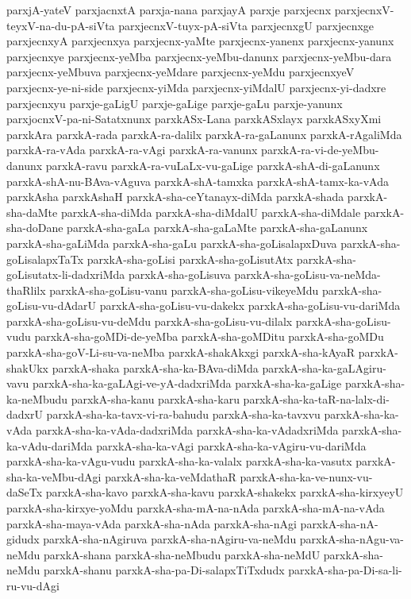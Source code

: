 {parxjA-yateV
parxjacnxtA
parxja-nana
parxjayA
parxje
parxjecnx
parxjecnxV-teyxV-na-du-pA-siVta
parxjecnxV-tuyx-pA-siVta
parxjecnxgU
parxjecnxge
parxjecnxyA
parxjecnxya
parxjecnx-yaMte
parxjecnx-yanenx
parxjecnx-yanunx
parxjecnxye
parxjecnx-yeMba
parxjecnx-yeMbu-danunx
parxjecnx-yeMbu-dara
parxjecnx-yeMbuva
parxjecnx-yeMdare
parxjecnx-yeMdu
parxjecnxyeV
parxjecnx-ye-ni-side
parxjecnx-yiMda
parxjecnx-yiMdalU
parxjecnx-yi-dadxre
parxjecnxyu
parxje-gaLigU
parxje-gaLige
parxje-gaLu
parxje-yanunx
parxjocnxV-pa-ni-Satatxnunx
parxkASx-Lana
parxkASxlayx
parxkASxyXmi
parxkAra
parxkA-rada
parxkA-ra-dalilx
parxkA-ra-gaLanunx
parxkA-rAgaliMda
parxkA-ra-vAda
parxkA-ra-vAgi
parxkA-ra-vanunx
parxkA-ra-vi-de-yeMbu-danunx
parxkA-ravu
parxkA-ra-vuLaLx-vu-gaLige
parxkA-shA-di-gaLanunx
parxkA-shA-nu-BAva-vAguva
parxkA-shA-tamxka
parxkA-shA-tamx-ka-vAda
parxkAsha
parxkAshaH
parxkA-sha-ceYtanayx-diMda
parxkA-shada
parxkA-sha-daMte
parxkA-sha-diMda
parxkA-sha-diMdalU
parxkA-sha-diMdale
parxkA-sha-doDane
parxkA-sha-gaLa
parxkA-sha-gaLaMte
parxkA-sha-gaLanunx
parxkA-sha-gaLiMda
parxkA-sha-gaLu
parxkA-sha-goLisalapxDuva
parxkA-sha-goLisalapxTaTx
parxkA-sha-goLisi
parxkA-sha-goLisutAtx
parxkA-sha-goLisutatx-li-dadxriMda
parxkA-sha-goLisuva
parxkA-sha-goLisu-va-neMda-thaRlilx
parxkA-sha-goLisu-vanu
parxkA-sha-goLisu-vikeyeMdu
parxkA-sha-goLisu-vu-dAdarU
parxkA-sha-goLisu-vu-dakekx
parxkA-sha-goLisu-vu-dariMda
parxkA-sha-goLisu-vu-deMdu
parxkA-sha-goLisu-vu-dilalx
parxkA-sha-goLisu-vudu
parxkA-sha-goMDi-de-yeMba
parxkA-sha-goMDitu
parxkA-sha-goMDu
parxkA-sha-goV-Li-su-va-neMba
parxkA-shakAkxgi
parxkA-sha-kAyaR
parxkA-shakUkx
parxkA-shaka
parxkA-sha-ka-BAva-diMda
parxkA-sha-ka-gaLAgiru-vavu
parxkA-sha-ka-gaLAgi-ve-yA-dadxriMda
parxkA-sha-ka-gaLige
parxkA-sha-ka-neMbudu
parxkA-sha-kanu
parxkA-sha-karu
parxkA-sha-ka-taR-na-lalx-di-dadxrU
parxkA-sha-ka-tavx-vi-ra-bahudu
parxkA-sha-ka-tavxvu
parxkA-sha-ka-vAda
parxkA-sha-ka-vAda-dadxriMda
parxkA-sha-ka-vAdadxriMda
parxkA-sha-ka-vAdu-dariMda
parxkA-sha-ka-vAgi
parxkA-sha-ka-vAgiru-vu-dariMda
parxkA-sha-ka-vAgu-vudu
parxkA-sha-ka-valalx
parxkA-sha-ka-vasutx
parxkA-sha-ka-veMbu-dAgi
parxkA-sha-ka-veMdathaR
parxkA-sha-ka-ve-nunx-vu-daSeTx
parxkA-sha-kavo
parxkA-sha-kavu
parxkA-shakekx
parxkA-sha-kirxyeyU
parxkA-sha-kirxye-yoMdu
parxkA-sha-mA-na-nAda
parxkA-sha-mA-na-vAda
parxkA-sha-maya-vAda
parxkA-sha-nAda
parxkA-sha-nAgi
parxkA-sha-nA-gidudx
parxkA-sha-nAgiruva
parxkA-sha-nAgiru-va-neMdu
parxkA-sha-nAgu-va-neMdu
parxkA-shana
parxkA-sha-neMbudu
parxkA-sha-neMdU
parxkA-sha-neMdu
parxkA-shanu
parxkA-sha-pa-Di-salapxTiTxdudx
parxkA-sha-pa-Di-sa-li-ru-vu-dAgi
}
